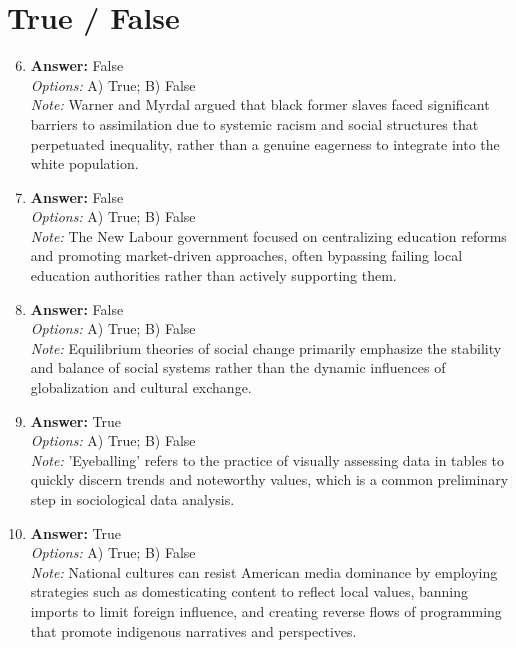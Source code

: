 \documentclass[12pt]{article}
\begin{document}
\section*{True / False}
\begin{enumerate}[label=\arabic*.]
\setcounter{enumi}{5}
\item \textbf{Answer:} False
\\ \textit{Options:} A) True; B) False
\\ \textit{Note:} Warner and Myrdal argued that black former slaves faced significant barriers to assimilation due to systemic racism and social structures that perpetuated inequality, rather than a genuine eagerness to integrate into the white population.
\item \textbf{Answer:} False
\\ \textit{Options:} A) True; B) False
\\ \textit{Note:} The New Labour government focused on centralizing education reforms and promoting market-driven approaches, often bypassing failing local education authorities rather than actively supporting them.
\item \textbf{Answer:} False
\\ \textit{Options:} A) True; B) False
\\ \textit{Note:} Equilibrium theories of social change primarily emphasize the stability and balance of social systems rather than the dynamic influences of globalization and cultural exchange.
\item \textbf{Answer:} True
\\ \textit{Options:} A) True; B) False
\\ \textit{Note:} 'Eyeballing' refers to the practice of visually assessing data in tables to quickly discern trends and noteworthy values, which is a common preliminary step in sociological data analysis.
\item \textbf{Answer:} True
\\ \textit{Options:} A) True; B) False
\\ \textit{Note:} National cultures can resist American media dominance by employing strategies such as domesticating content to reflect local values, banning imports to limit foreign influence, and creating reverse flows of programming that promote indigenous narratives and perspectives.
\end{enumerate}
\end{document}
